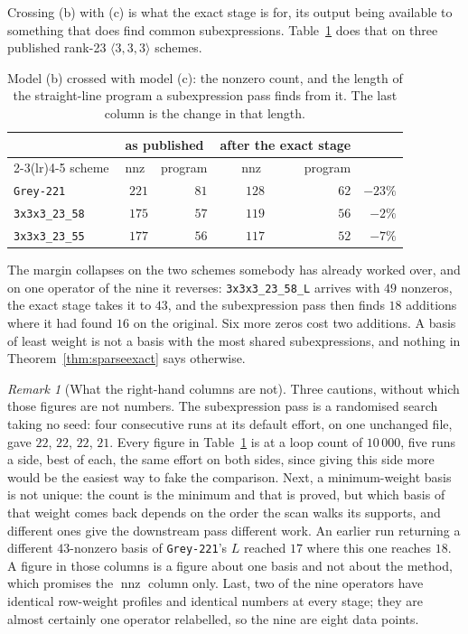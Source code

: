 \documentclass[11pt,reqno]{amsart}
\theoremstyle{plain}
\theoremstyle{definition}
\theoremstyle{remark}
\newtheorem{remark}[theorem]{Remark}
\newcommand{\nnz}{\operatorname{nnz}}
\begin{document}
Crossing (b) with (c) is what the exact stage is for, its output being available
to something that does find common subexpressions. Table~\ref{tab:cse} does that
on three published rank-23 $\langle 3,3,3\rangle$ schemes.

\begin{table}[ht]
\centering
\begin{tabular}{lrrrrr}
\toprule
 & \multicolumn{2}{c}{as published} & \multicolumn{2}{c}{after the exact stage} & \\
\cmidrule(lr){2-3}\cmidrule(lr){4-5}
scheme & $\nnz$ & program & $\nnz$ & program & \\
\midrule
\texttt{Grey-221}      & $221$ & $81$ & $128$ & $62$ & $-23\%$ \\
\texttt{3x3x3\_23\_58} & $175$ & $57$ & $119$ & $56$ & $-2\%$  \\
\texttt{3x3x3\_23\_55} & $177$ & $56$ & $117$ & $52$ & $-7\%$  \\
\bottomrule
\end{tabular}
\vspace{0.5em}
\caption{Model (b) crossed with model (c): the nonzero count, and the length of
the straight-line program a subexpression pass finds from it. The last column is
the change in that length.}\label{tab:cse}
\end{table}

The margin collapses on the two schemes somebody has already worked over, and on
one operator of the nine it reverses: \texttt{3x3x3\_23\_58\_L} arrives with $49$
nonzeros, the exact stage takes it to $43$, and the subexpression pass then finds
$18$ additions where it had found $16$ on the original. Six more zeros cost two
additions. A basis of least weight is not a basis with the most shared
subexpressions, and nothing in Theorem~\ref{thm:sparseexact} says otherwise.

\begin{remark}[What the right-hand columns are not]
Three cautions, without which those figures are not numbers. The subexpression
pass is a randomised search taking no seed: four consecutive runs at its default
effort, on one unchanged file, gave $22$, $22$, $22$, $21$. Every figure in
Table~\ref{tab:cse} is at a loop count of $10\,000$, five runs a side, best of
each, the same effort on both sides, since giving this side more would be the
easiest way to fake the comparison. Next, a minimum-weight basis is not unique:
the count is the minimum and that is proved, but which basis of that weight comes
back depends on the order the scan walks its supports, and different ones give
the downstream pass different work. An earlier run returning a different
$43$-nonzero basis of \texttt{Grey-221}'s $L$ reached $17$ where this one reaches
$18$. A figure in those columns is a figure about one basis and not about the
method, which promises the $\nnz$ column only. Last, two of the nine operators
have identical row-weight profiles and identical numbers at every stage; they are
almost certainly one operator relabelled, so the nine are eight data points.
\end{remark}
\end{document}
